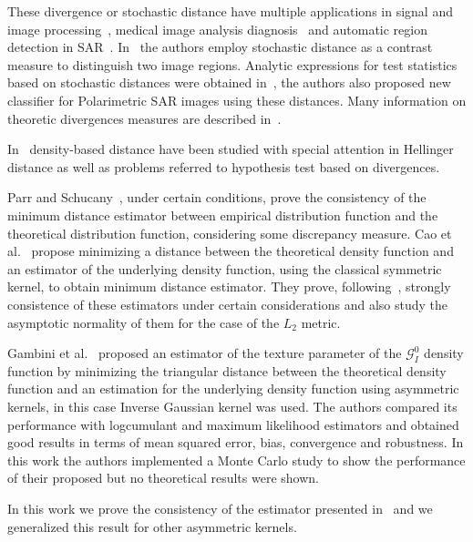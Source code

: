 \documentclass[journal]{IEEEtran}
\numberwithin{equation}{section}
\begin{document}
These divergence or stochastic distance have multiple applications in signal and image processing~\cite{4218961}, medical image analysis diagnosis~\cite{5599869} and automatic region detection in SAR~\cite{EdgeDetectionDistancesEntropiesJSTARS,SARSegmentationLevelSetGA0}. In~\cite{Nascimento2009} the authors employ stochastic distance as a contrast measure to distinguish two image regions. Analytic expressions for test statistics based on stochastic distances were obtained in~\cite{ClassificationPolSARSegmentsMinimizationWishartDistances}, the authors also proposed new classifier for Polarimetric SAR images using these distances. Many information on theoretic divergences measures are described in~\cite{Liese2006}.

In~\cite{Basu2011} density-based distance have been studied with special attention in Hellinger distance as well as problems referred to hypothesis test based on divergences.

Parr and Schucany~\cite{parr1982}, under certain conditions, prove the consistency of the minimum distance estimator between empirical distribution function and the theoretical distribution function, considering some discrepancy measure. Cao et al.~\cite{cao1995minimum} propose minimizing a distance between the theoretical density function and an estimator of the underlying density function, using the classical symmetric kernel,  to obtain minimum distance estimator. They prove, following~\cite{parr1982}, strongly consistence of these estimators under certain considerations and also study the asymptotic normality of them for the case of the $L_2$ metric. 

Gambini et al.~\cite{gambini2015} proposed an estimator of the texture parameter of the $\mathcal{G}_I^0$ density function by  minimizing the triangular distance between the theoretical density function  and an estimation for the underlying density function using asymmetric kernels, in this case Inverse Gaussian kernel was used. The authors compared its performance with logcumulant and maximum likelihood estimators and obtained good results in terms of mean squared error, bias, convergence and robustness. In this work the authors implemented a Monte Carlo study to show the performance of their proposed but no theoretical results were shown.

In this work we prove the consistency of the estimator presented in~\cite{gambini2015} and we generalized this result for other asymmetric kernels.
\end{document}
